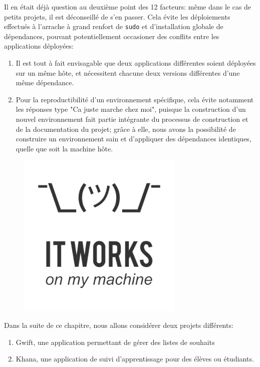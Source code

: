 \documentclass[11pt]{amsbook}
\begin{document}
Il en était déjà question au deuxième point des 12 facteurs: même dans le cas de petits projets, il est déconseillé de s’en passer.
Cela évite les déploiements effectués à l’arrache à grand renfort de \texttt{sudo} et d’installation globale de dépendances, pouvant potentiellement occasioner des conflits entre les applications déployées:


\begin{enumerate}

\item{Il est tout à fait envisagable que deux applications différentes soient déployées sur un même hôte, et nécessitent chacune deux versions différentes d’une même dépendance.}

\item{Pour la reproductibilité d’un environnement spécifique, cela évite notamment les réponses type "Ca juste marche chez moi", puisque la construction d’un nouvel environnement fait partie intégrante du processus de construction et de la documentation du projet; grâce à elle, nous avons la possibilité de construire un environnement sain et d’appliquer des dépendances identiques, quelle que soit la machine hôte.}

\end{enumerate}


\begin{figure}[h]{}
\centering\includegraphics[width=2.5truein]{images/it-works-on-my-machine.jpg}


\end{figure}

Dans la suite de ce chapitre, nous allons considérer deux projets différents:


\begin{enumerate}

\item{Gwift, une application permettant de gérer des listes de souhaits}

\item{Khana, une application de suivi d’apprentissage pour des élèves ou étudiants.}

\end{enumerate}
\end{document}
